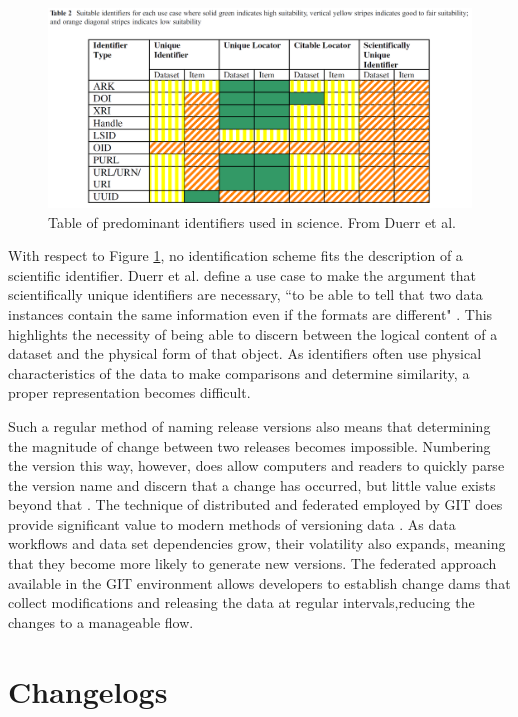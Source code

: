 \begin{figure}
	\centering
	\includegraphics[scale=0.30]{figures/DigitalIdentifierTable.png}
	\caption{Table of predominant identifiers used in science.  From Duerr et al. \cite{Duerr2011}}
	\label{table:Duerr}
\end{figure}

With respect to Figure \ref{table:Duerr}, no identification scheme fits the description of a scientific identifier.
Duerr et al. define a use case to make the argument that scientifically unique identifiers are necessary, ``to be able to tell that two data instances contain the same information even if the formats are different" \cite{Duerr2011}.
This highlights the necessity of being able to discern between the logical content of a dataset and the physical form of that object.
As identifiers often use physical characteristics of the data to make comparisons and determine similarity, a proper representation becomes difficult.

Such a regular method of naming release versions also means that determining the magnitude of change between two releases becomes impossible.
Numbering the version this way, however, does allow computers and readers to quickly parse the version name and discern that a change has occurred, but little value exists beyond that \cite{Dijkstra1994}.
The technique of distributed and federated employed by GIT does provide significant value to modern methods of versioning data \cite{cederqvist2002version}.
As data workflows and data set dependencies grow, their volatility also expands, meaning that they become more likely to generate new versions.
The federated approach available in the GIT environment allows developers to establish change dams that collect modifications and releasing the data at regular intervals,reducing the changes to a manageable flow.

\section{Changelogs}

